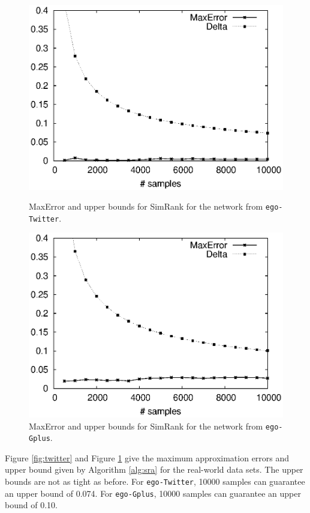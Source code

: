 \documentclass{article}
\begin{document}
\begin{figure}[!t]
\centering
\begin{minipage}{.45\textwidth}
\centering
\includegraphics[width=.9\textwidth]{simrank_twitter_apprx_error.eps}
\caption{\textsf{MaxError} and upper bounds for SimRank for the network from \texttt{ego-Twitter}.}
\label{fig:twitter}
\end{minipage}
\hspace{1cm}
\begin{minipage}{.45\textwidth}
\centering
\includegraphics[width=.9\textwidth]{simrank_gplus_apprx_error.eps}
\caption{\textsf{MaxError} and upper bounds for SimRank for the network from \texttt{ego-Gplus}.}
\label{fig:gplus}
\end{minipage}
\end{figure}

Figure \ref{fig:twitter} and Figure \ref{fig:gplus} give the maximum approximation errors and upper bound given by Algorithm \ref{alg:sra} for the real-world data sets. The upper bounds are not as tight as before. For \texttt{ego-Twitter}, 10000 samples can guarantee an upper bound of 0.074. For \texttt{ego-Gplus}, 10000 samples can guarantee an upper bound of 0.10.
\end{document}
